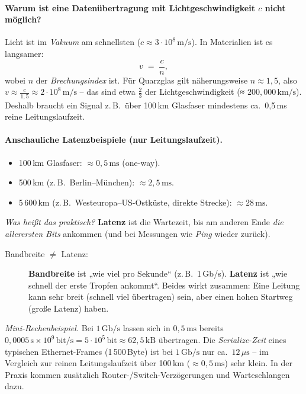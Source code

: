 \documentclass[../skript/main.tex]{subfiles}
\begin{document}
		
	\paragraph{Warum ist eine Datenübertragung mit Lichtgeschwindigkeit \(c\) nicht möglich?}
	Licht ist im \emph{Vakuum} am schnellsten (\(c \approx 3\cdot 10^8\,\text{m/s}\)). In Materialien ist es langsamer:
	\[
	v \;=\; \frac{c}{n},
	\]
	wobei \(n\) der \emph{Brechungsindex} ist. Für Quarzglas gilt näherungsweise \(n \approx 1{,}5\), also
	\(v \approx \tfrac{c}{1{,}5} \approx 2\cdot 10^8\,\text{m/s}\) – das sind etwa \(\tfrac{2}{3}\) der Lichtgeschwindigkeit
	(≈ \(200{,}000\,\text{km/s}\)). Deshalb braucht ein Signal z.\,B.\ über 100\,km Glasfaser mindestens ca.\ 0{,}5\,ms reine Leitungslaufzeit.
	
		
	\paragraph{Anschauliche Latenzbeispiele (nur Leitungslaufzeit).}
	\begin{itemize}
		\item 100\,km Glasfaser: \(\approx 0{,}5\,\text{ms}\) (one-way).
		\item 500\,km (z.\,B.\ Berlin–München): \(\approx 2{,}5\,\text{ms}\).
		\item 5\,600\,km (z.\,B.\ Westeuropa–US-Ostküste, direkte Strecke): \(\approx 28\,\text{ms}\).
	\end{itemize}
	
	\textit{Was heißt das praktisch?} \textbf{Latenz} ist die Wartezeit, bis am anderen Ende \emph{die allerersten Bits}
	ankommen (und bei Messungen wie \emph{Ping} wieder zurück).
	
	\begin{description}
		\item[Bandbreite \(\neq\) Latenz:] \textbf{Bandbreite} ist „wie viel pro Sekunde“ (z.\,B.\ 1\,Gb/s). \textbf{Latenz} ist „wie schnell der erste
		Tropfen ankommt“. Beides wirkt zusammen: Eine Leitung kann sehr breit (schnell viel übertragen) sein,
		aber einen hohen Startweg (große Latenz) haben.
	\end{description}
	
	\textit{Mini-Rechenbeispiel.} Bei \(1\,\text{Gb/s}\) lassen sich in \(0{,}5\,\text{ms}\) bereits
	\(0{,}0005\,\text{s} \times 10^9\,\text{bit/s} = 5{\cdot}10^5\,\text{bit} \approx 62{,}5\,\text{kB}\) übertragen.
	Die \emph{Serialize-Zeit} eines typischen Ethernet-Frames (1\,500\,Byte) ist bei \(1\,\text{Gb/s}\) nur ca.\ \(12\,\mu\text{s}\) – im Vergleich zur
	reinen Leitungslaufzeit über 100\,km (\(\approx 0{,}5\,\text{ms}\)) sehr klein. In der Praxis kommen zusätzlich
	Router-/Switch-Verzögerungen und Warteschlangen dazu.
\end{document}
